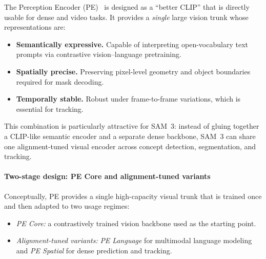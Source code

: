 \begin{enrichment}
\begin{enrichment}
		The Perception Encoder (PE)~\cite{bolya2025_perceptionencoder} is designed as a ``better CLIP'' that is directly usable for dense and video tasks. It provides a \emph{single} large vision trunk whose representations are:
		\begin{itemize}
			\item \textbf{Semantically expressive.} Capable of interpreting open-vocabulary text prompts via contrastive vision--language pretraining.
			\item \textbf{Spatially precise.} Preserving pixel-level geometry and object boundaries required for mask decoding.
			\item \textbf{Temporally stable.} Robust under frame-to-frame variations, which is essential for tracking.
		\end{itemize}
		This combination is particularly attractive for SAM~3: instead of gluing together a CLIP-like semantic encoder and a separate dense backbone, SAM~3 can share one alignment-tuned visual encoder across concept detection, segmentation, and tracking.
		
		\paragraph{Two-stage design: PE Core and alignment-tuned variants}
		
		Conceptually, PE provides a single high-capacity visual trunk that is trained once and then adapted to two usage regimes:
		\begin{itemize}
			\item \emph{PE Core:} a contrastively trained vision backbone used as the starting point.
			\item \emph{Alignment-tuned variants:} \emph{PE Language} for multimodal language modeling and \emph{PE Spatial} for dense prediction and tracking.
		\end{itemize}
		

\end{enrichment}
\end{enrichment}
